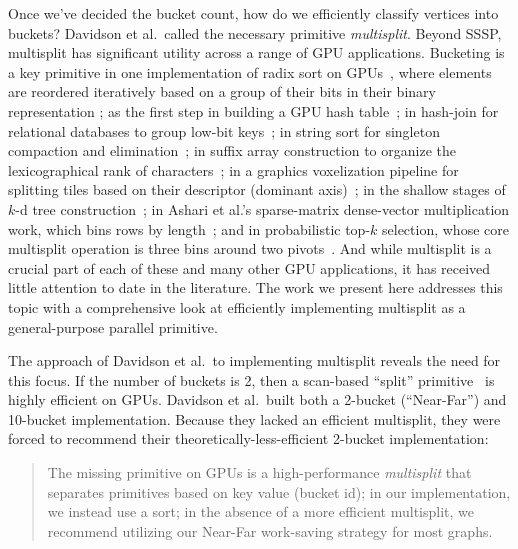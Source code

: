 Once we've decided the bucket count, how do we efficiently classify vertices into buckets? Davidson et al.\ called the necessary primitive \emph{multisplit}. Beyond SSSP, multisplit has significant utility across a range of GPU applications.
Bucketing is a key primitive in one implementation of radix sort on GPUs~\cite{Merrill:2010:RSF}, where elements are reordered iteratively based on a group of their bits in their binary representation%
; as the first step in building a GPU hash table~\cite{Alcantara:2009:RPH:nourl}; in hash-join for relational databases to group low-bit keys~\cite{Diamos:2012:ERA}; in string sort for singleton compaction and elimination~\cite{Deshpande:2013:CGS}; in suffix array construction to organize the lexicographical rank of characters~\cite{Deo:2013:PSA}; in a graphics voxelization pipeline for splitting tiles based on their descriptor (dominant axis)~\cite{Pantaleoni:2011:VAP}; in the shallow stages of $k$-d tree construction~\cite{Wu:2011:SKC}; in Ashari et al.'s sparse-matrix dense-vector multiplication work, which bins rows by length~\cite{Ashari:2014:FSM}; and in probabilistic top-$k$ selection, whose core multisplit operation is three bins around two pivots~\cite{Monroe:2011:RSO}. And while multisplit is a crucial part of each of these and many other GPU applications, it has received little attention to date in the literature. The work we present here addresses this topic with a comprehensive look at efficiently implementing multisplit as a general-purpose parallel primitive.

The approach of Davidson et al.\ to implementing multisplit reveals the need for this focus. If the number of buckets is 2, then a scan-based ``split'' primitive~\cite{Harris:2007:PPS:nourl} is highly efficient on GPUs. Davidson et al.\ built both a 2-bucket (``Near-Far'') and 10-bucket implementation. Because they lacked an efficient multisplit, they were forced to recommend their theoretically-less-efficient 2-bucket implementation:

\begin{quote}\vspace{-2pt}
  The missing primitive on GPUs is a high-performance \emph{multisplit} that separates primitives based on key value (bucket id); in our implementation, we instead use a sort; in the absence of a more efficient multisplit, we recommend utilizing our Near-Far work-saving strategy for most graphs.~\cite[Section~7]{Davidson:2014:WPG:nourl}\vspace{-2pt}
\end{quote}

